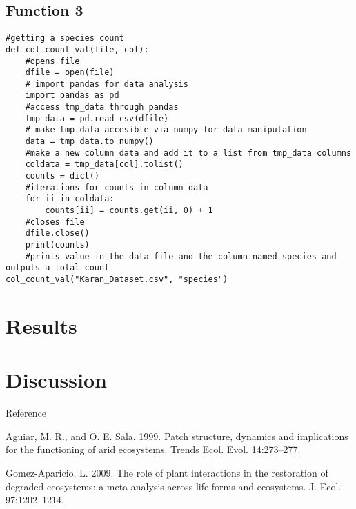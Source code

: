 \documentclass[letterpaper]{article}
\begin{document}
\subsection{Function 3 }
\begin{verbatim}
#getting a species count
def col_count_val(file, col):
    #opens file
    dfile = open(file)
    # import pandas for data analysis
    import pandas as pd
    #access tmp_data through pandas
    tmp_data = pd.read_csv(dfile)
    # make tmp_data accesible via numpy for data manipulation
    data = tmp_data.to_numpy()
    #make a new column data and add it to a list from tmp_data columns
    coldata = tmp_data[col].tolist()
    counts = dict()
    #iterations for counts in column data
    for ii in coldata:
        counts[ii] = counts.get(ii, 0) + 1
    #closes file
    dfile.close()
    print(counts)
    #prints value in the data file and the column named species and outputs a total count
col_count_val("Karan_Dataset.csv", "species")

\end{verbatim}


\section{Results}


\section{Discussion}

\newpage
Reference


Aguiar, M. R., and O. E. Sala. 1999. Patch structure, dynamics and implications for the functioning of arid ecosystems. Trends Ecol. Evol. 14:273–277.

Gomez-Aparicio, L. 2009. The role of plant interactions in the restoration of degraded ecosystems: a meta-analysis across life-forms and ecosystems. J. Ecol. 97:1202–1214.
\end{document}
